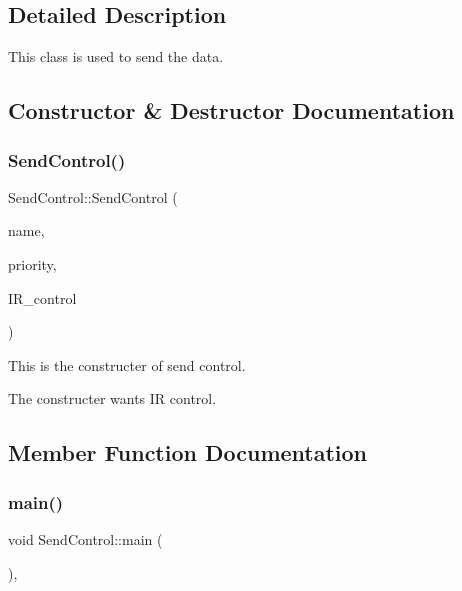 \subsection{Detailed Description}
This class is used to send the data. 

\subsection{Constructor \& Destructor Documentation}
\mbox{\label{class_send_control_af666c41a0c262bf86bbb3009003b2c81}} 
\subsubsection{\texorpdfstring{Send\+Control()}{SendControl()}}
{\footnotesize\ttfamily Send\+Control\+::\+Send\+Control (\begin{DoxyParamCaption}\item[{const char $\ast$}]{name,  }\item[{int}]{priority,  }\item[{\mbox{\hyperlink{class_i_r_control}{I\+R\+Control}} \&}]{I\+R\+\_\+control }\end{DoxyParamCaption})\hspace{0.3cm}{\ttfamily [inline]}}



This is the constructer of send control. 

The constructer wants IR control. 

\subsection{Member Function Documentation}
\mbox{\label{class_send_control_aedec285713d090002e2848228cef2617}} 
\subsubsection{\texorpdfstring{main()}{main()}}
{\footnotesize\ttfamily void Send\+Control\+::main (\begin{DoxyParamCaption}{ }\end{DoxyParamCaption})\hspace{0.3cm}{\ttfamily [inline]}, {\ttfamily [override]}}




